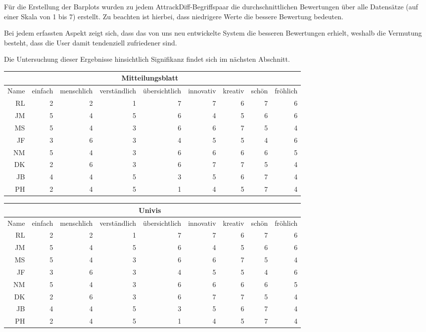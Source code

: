 \documentclass[a4paper,10pt]{scrartcl}
\begin{document}
Für die Erstellung der Barplots wurden zu jedem AttrackDiff-Begriffspaar die durchschnittlichen Bewertungen über alle Datensätze (auf einer Skala von 1 bis 7) erstellt. Zu beachten ist hierbei, dass niedrigere Werte die bessere Bewertung bedeuten.

Bei jedem erfassten Aspekt zeigt sich, dass das von uns neu entwickelte System die besseren Bewertungen erhielt, weshalb die Vermutung besteht, dass die User damit tendenziell zufriedener sind.

Die Untersuchung dieser Ergebnisse hinsichtlich Signifikanz findet sich im nächsten Abschnitt.

\begin{center}
\begin{tabular}{r|r|r|r|r|r|r|r|r}
     & \multicolumn{7}{c}{Mitteilungsblatt} \\ \hline
    Name & einfach & menschlich & verständlich & übersichtlich & innovativ & kreativ & schön & fröhlich \\ \hline
    RL & 2 & 2 & 1 & 7 & 7 & 6 & 7 & 6 \\ \hline
    JM & 5 & 4 & 5 & 6 & 4 & 5 & 6 & 6 \\ \hline
    MS & 5 & 4 & 3 & 6 & 6 & 7 & 5 & 4 \\ \hline
    JF & 3 & 6 & 3 & 4 & 5 & 5 & 4 & 6 \\ \hline
    NM & 5 & 4 & 3 & 6 & 6 & 6 & 6 & 5 \\ \hline
    DK & 2 & 6 & 3 & 6 & 7 & 7 & 5 & 4 \\ \hline
    JB & 4 & 4 & 5 & 3 & 5 & 6 & 7 & 4 \\ \hline
    PH & 2 & 4 & 5 & 1 & 4 & 5 & 7 & 4 \\
\end{tabular}
\end{center}

\begin{center}
\begin{tabular}{r|r|r|r|r|r|r|r|r}
     & \multicolumn{7}{c}{Univis} \\ \hline
    Name & einfach & menschlich & verständlich & übersichtlich & innovativ & kreativ & schön & fröhlich \\ \hline
    RL & 2 & 2 & 1 & 7 & 7 & 6 & 7 & 6 \\ \hline
    JM & 5 & 4 & 5 & 6 & 4 & 5 & 6 & 6 \\ \hline
    MS & 5 & 4 & 3 & 6 & 6 & 7 & 5 & 4 \\ \hline
    JF & 3 & 6 & 3 & 4 & 5 & 5 & 4 & 6 \\ \hline
    NM & 5 & 4 & 3 & 6 & 6 & 6 & 6 & 5 \\ \hline
    DK & 2 & 6 & 3 & 6 & 7 & 7 & 5 & 4 \\ \hline
    JB & 4 & 4 & 5 & 3 & 5 & 6 & 7 & 4 \\ \hline
    PH & 2 & 4 & 5 & 1 & 4 & 5 & 7 & 4 \\
\end{tabular}
\end{center}
\end{document}

